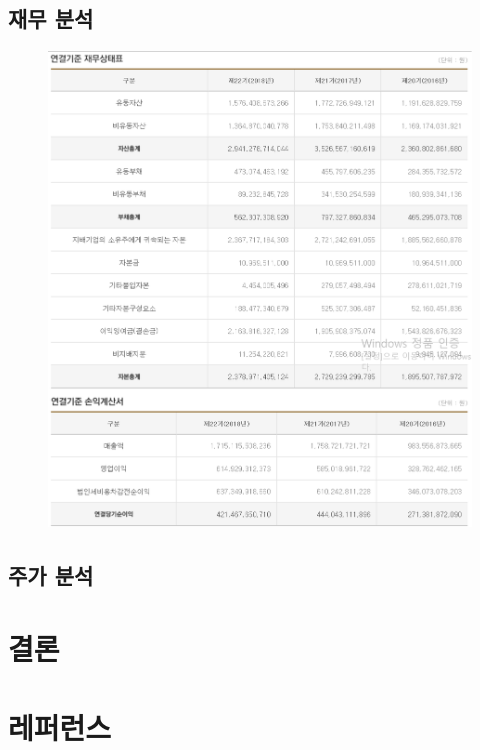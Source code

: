 \documentclass[11pt]{oblivoir}
\begin{document}
		\subsection{재무 분석}
		\begin{figure}[htbp]
			\centering
			\includegraphics[width=1\textwidth]{Pictures/zaemustate.png}
		\end{figure}
		
		\subsection{주가 분석}
	
	\section{결론}
	
	\section{레퍼런스}
	
\end{document}
